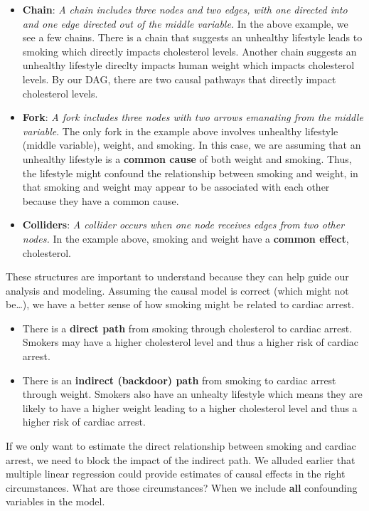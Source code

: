\documentclass[
]{book}
\providecommand{\tightlist}{%
  \setlength{\itemsep}{0pt}\setlength{\parskip}{0pt}}
\begin{document}
\begin{itemize}
\item
  \textbf{Chain}: \emph{A chain includes three nodes and two edges, with one directed into and one edge directed out of the middle variable.} In the above example, we see a few chains. There is a chain that suggests an unhealthy lifestyle leads to smoking which directly impacts cholesterol levels. Another chain suggests an unhealthy lifestyle direclty impacts human weight which impacts cholesterol levels. By our DAG, there are two causal pathways that directly impact cholesterol levels.
\item
  \textbf{Fork}: \emph{A fork includes three nodes with two arrows emanating from the middle variable}. The only fork in the example above involves unhealthy lifestyle (middle variable), weight, and smoking. In this case, we are assuming that an unhealthy lifestyle is a \textbf{common cause} of both weight and smoking. Thus, the lifestyle might confound the relationship between smoking and weight, in that smoking and weight may appear to be associated with each other because they have a common cause.
\item
  \textbf{Colliders}: \emph{A collider occurs when one node receives edges from two other nodes.} In the example above, smoking and weight have a \textbf{common effect}, cholesterol.
\end{itemize}

These structures are important to understand because they can help guide our analysis and modeling. Assuming the causal model is correct (which might not be\ldots), we have a better sense of how smoking might be related to cardiac arrest.

\begin{itemize}
\tightlist
\item
  There is a \textbf{direct path} from smoking through cholesterol to cardiac arrest. Smokers may have a higher cholesterol level and thus a higher risk of cardiac arrest.
\item
  There is an \textbf{indirect (backdoor) path} from smoking to cardiac arrest through weight. Smokers also have an unhealty lifestyle which means they are likely to have a higher weight leading to a higher cholesterol level and thus a higher risk of cardiac arrest.
\end{itemize}

If we only want to estimate the direct relationship between smoking and cardiac arrest, we need to block the impact of the indirect path. We alluded earlier that multiple linear regression could provide estimates of causal effects in the right circumstances. What are those circumstances? When we include \textbf{all} confounding variables in the model.
\end{document}
